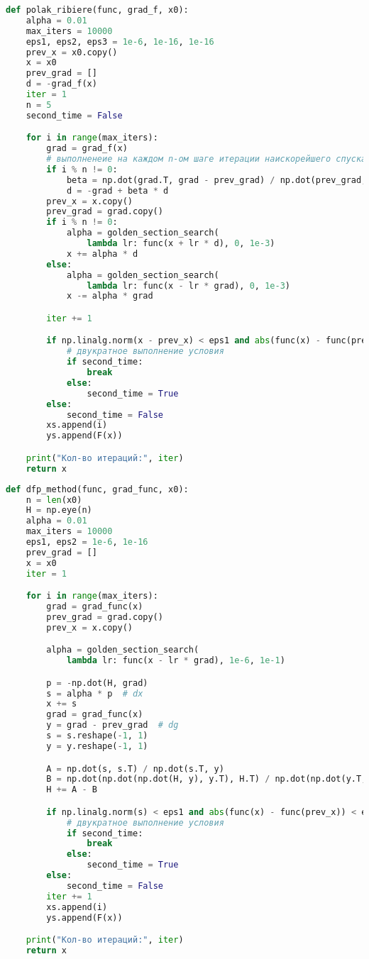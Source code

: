 \documentclass[a4paper, 14pt]{extarticle}
\begin{document}
\begin{lstlisting}[language=Python,caption={Метод Полака-Рибьера},label={lst:code2}]
def polak_ribiere(func, grad_f, x0):
    alpha = 0.01
    max_iters = 10000
    eps1, eps2, eps3 = 1e-6, 1e-16, 1e-16
    prev_x = x0.copy()
    x = x0
    prev_grad = []
    d = -grad_f(x)
    iter = 1
    n = 5
    second_time = False

    for i in range(max_iters):
        grad = grad_f(x)
        # выполненеие на каждом n-ом шаге итерации наискорейшего спуска
        if i % n != 0:
            beta = np.dot(grad.T, grad - prev_grad) / np.dot(prev_grad, prev_grad)
            d = -grad + beta * d
        prev_x = x.copy()
        prev_grad = grad.copy()
        if i % n != 0:
            alpha = golden_section_search(
                lambda lr: func(x + lr * d), 0, 1e-3)
            x += alpha * d
        else:
            alpha = golden_section_search(
                lambda lr: func(x - lr * grad), 0, 1e-3)
            x -= alpha * grad

        iter += 1

        if np.linalg.norm(x - prev_x) < eps1 and abs(func(x) - func(prev_x)) < eps2 or np.linalg.norm(grad) < eps3:
            # двукратное выполнение условия
            if second_time:
                break
            else:
                second_time = True
        else:
            second_time = False
        xs.append(i)
        ys.append(F(x))

    print("Кол-во итераций:", iter)
    return x
\end{lstlisting}

\begin{lstlisting}[language=Python,caption={Метод Девидона-Флетчера-Пауэлла},label={lst:code3}]
def dfp_method(func, grad_func, x0):
    n = len(x0)
    H = np.eye(n)
    alpha = 0.01
    max_iters = 10000
    eps1, eps2 = 1e-6, 1e-16
    prev_grad = []
    x = x0
    iter = 1

    for i in range(max_iters):
        grad = grad_func(x)
        prev_grad = grad.copy()
        prev_x = x.copy()

        alpha = golden_section_search(
            lambda lr: func(x - lr * grad), 1e-6, 1e-1)

        p = -np.dot(H, grad)
        s = alpha * p  # dx
        x += s
        grad = grad_func(x)
        y = grad - prev_grad  # dg
        s = s.reshape(-1, 1)
        y = y.reshape(-1, 1)

        A = np.dot(s, s.T) / np.dot(s.T, y)
        B = np.dot(np.dot(np.dot(H, y), y.T), H.T) / np.dot(np.dot(y.T, H), y)
        H += A - B

        if np.linalg.norm(s) < eps1 and abs(func(x) - func(prev_x)) < eps2:
            # двукратное выполнение условия
            if second_time:
                break
            else:
                second_time = True
        else:
            second_time = False
        iter += 1
        xs.append(i)
        ys.append(F(x))

    print("Кол-во итераций:", iter)
    return x

\end{lstlisting}
\end{document}

